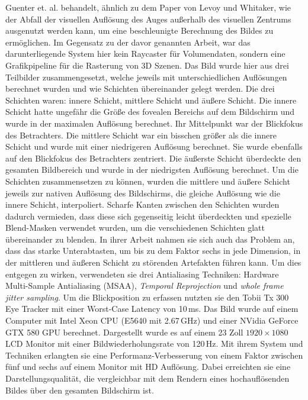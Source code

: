 Guenter et. al. \cite{foveated-3d-graphics} behandelt, ähnlich zu dem Paper von Levoy und Whitaker, wie der Abfall der visuellen Auflösung des Auges außerhalb des visuellen Zentrums ausgenutzt werden kann, um eine beschleunigte Berechnung des Bildes zu ermöglichen.
Im Gegensatz zu der davor genannten Arbeit, war das darunterliegende System hier kein Raycaster für Volumendaten, sondern eine Grafikpipeline für die Rasterung von 3D Szenen.
Das Bild wurde hier aus drei Teilbilder zusammengesetzt, welche jeweils mit unterschiedlichen Auflösungen berechnet wurden und wie Schichten übereinander gelegt werden.
Die drei Schichten waren: innere Schicht, mittlere Schicht und äußere Schicht.
Die innere Schicht hatte ungefähr die Größe des fovealen Bereichs auf dem Bildschirm und wurde in der maximalen Auflösung berechnet.
Ihr Mittelpunkt war der Blickfokus des Betrachters.
Die mittlere Schicht war ein bisschen größer als die innere Schicht und wurde mit einer niedrigeren Auflösung berechnet. 
Sie wurde ebenfalls auf den Blickfokus des Betrachters zentriert.
Die äußerste Schicht überdeckte den gesamten Bildbereich und wurde in der niedrigsten Auflösung berechnet.
Um die Schichten zusammensetzen zu können, wurden die mittlere und äußere Schicht jeweils zur nativen Auflösung des Bildschirms, die gleiche Auflösung wie die innere Schicht, interpoliert.
Scharfe Kanten zwischen den Schichten wurden dadurch vermieden, dass diese sich gegenseitig leicht überdeckten und spezielle Blend-Masken verwendet wurden, um die verschiedenen Schichten glatt übereinander zu blenden.
In ihrer Arbeit nahmen sie sich auch das Problem an, dass das starke Unterabtasten, um bis zu dem Faktor sechs in jede Dimension, in der mittleren und äußeren Schicht zu störenden Artefakten führen kann.
Um dies entgegen zu wirken, verwendeten sie drei Antialiasing Techniken: Hardware Multi-Sample Antialiasing (MSAA), \emph{Temporal Reprojection} und \emph{whole frame jitter sampling}.
Um die Blickposition zu erfassen nutzten sie den Tobii Tx 300 Eye Tracker mit einer Worst-Case Latency von 10\,ms.
Das Bild wurde auf einem Computer mit Intel Xeon CPU (E5640 mit 2.67\,GHz) und einer NVidia GeForce GTX 580 GPU berechnet.
Dargestellt wurde es auf einem 23 Zoll $1920\times1080$ LCD Monitor mit einer Bildwiederholungsrate von 120\,Hz.
Mit ihrem System und Techniken erlangten sie eine Performanz-Verbesserung von einem Faktor zwischen fünf und sechs auf einem Monitor mit HD Auflösung.
Dabei erreichten sie eine Darstellungsqualität, die vergleichbar mit dem Rendern eines hochauflösenden Bildes über den gesamten Bildschirm ist.

